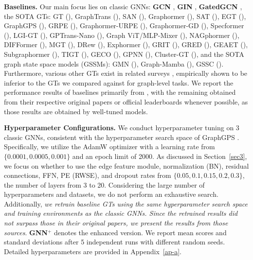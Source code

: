 \textbf{Baselines.} 
Our main focus lies on classic GNNs: \textbf{GCN} \cite{kipf2017semisupervised}, \textbf{GIN} \cite{xu2018powerful,hu2019strategies}, \textbf{GatedGCN} \cite{bresson2017residual}, the SOTA GTs: GT (\citeyear{dwivedi2020generalization}), GraphTrans (\citeyear{wu2021representing}), SAN (\citeyear{kreuzer2021rethinking}), Graphormer (\citeyear{ying2021transformers}), SAT (\citeyear{chen2022structure}), EGT (\citeyear{hussain2022global}), GraphGPS (\citeyear{rampavsek2022recipe, tonshoff2023did}), GRPE (\citeyear{park2022grpe}), Graphormer-URPE (\citeyear{luo2022your}), Graphormer-GD (\citeyear{zhang2023rethinking}), Specformer (\citeyear{bo2023specformer}), LGI-GT (\citeyear{yinlgi}), GPTrans-Nano (\citeyear{chen2023graph}), Graph ViT/MLP-Mixer (\citeyear{he2023generalization}), NAGphormer  (\citeyear{chen2023nagphormer}), DIFFormer  (\citeyear{wu2023difformer}), MGT (\citeyear{ngo2023multiresolution}), DRew (\citeyear{gutteridge2023drew}), Exphormer (\citeyear{shirzad2023exphormer}), GRIT (\citeyear{ma2023graph}), GRED (\citeyear{ding2024recurrent}), GEAET (\citeyear{liang2024graph}), Subgraphormer (\citeyear{bar2024subgraphormer}), TIGT (\citeyear{choi2024topology}), GECO (\citeyear{sancak2024scalable}), GPNN (\citeyear{lin2024understanding}), Cluster-GT (\citeyear{huang2024clusterwise}), and the SOTA graph state space models (GSSMs): GMN (\citeyear{behrouz2024graph}), Graph-Mamba (\citeyear{wang2024graph}), GSSC (\citeyear{huang2024can}).
Furthermore, various other GTs exist in related surveys \cite{hoang2024survey,shehzad2024graph,muller2023attending}, empirically shown to be inferior to the GTs we compared against for graph-level tasks. We report the performance results of baselines primarily from \cite{rampavsek2022recipe,tonshoff2023did}, with the remaining obtained from their respective original papers or official
leaderboards whenever possible, as those results are obtained by well-tuned models.


\textbf{Hyperparameter Configurations.} We conduct hyperparameter tuning on 3 classic GNNs, consistent with the hyperparameter search space of GraphGPS \cite{rampavsek2022recipe, tonshoff2023did}. Specifically, we utilize the AdamW optimizer \cite{loshchilov2017decoupled} with a learning rate from $\{0.0001, 0.0005, 0.001\}$ and an epoch limit of 2000. As discussed in Section~\ref{sec3}, we focus on whether to use the edge feature module, normalization (BN), residual connections, FFN, PE (RWSE), and dropout rates from $\{0.05, 0.1, 0.15, 0.2, 0.3\}$, the number of layers from 3 to 20. 
Considering the large number of hyperparameters and datasets, we do not perform an exhaustive search. Additionally, \emph{we retrain baseline GTs using the same hyperparameter search space and training environments as the classic GNNs. Since the retrained results did not surpass those in their original papers, we present the results from those sources}. \textbf{GNN$^+$} denotes the enhanced version. We report mean scores and standard deviations after 5 independent runs with different random seeds. Detailed hyperparameters are provided in Appendix~\ref{ap-a}.


